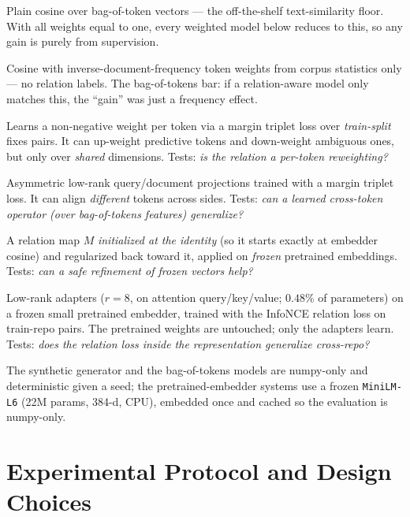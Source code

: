 \documentclass[11pt]{article}
\newcommand{\code}[1]{\texttt{#1}}
\newcommand{\rel}[1]{\textsf{#1}}
\begin{document}
\begin{description}[leftmargin=1.4em,style=nextline]
\item[Vanilla cosine.] Plain cosine over bag-of-token vectors --- the
off-the-shelf text-similarity floor. With all weights equal to one, every weighted
model below reduces to this, so any gain is purely from supervision.
\item[Unsupervised IDF cosine.] Cosine with inverse-document-frequency token
weights from corpus statistics only --- no relation labels. The bag-of-tokens bar:
if a relation-aware model only matches this, the ``gain'' was just a frequency
effect.
\item[Diagonal relation metric.] Learns a non-negative weight per token via a
margin triplet loss over \emph{train-split} \rel{fixes} pairs. It can up-weight
predictive tokens and down-weight ambiguous ones, but only over \emph{shared}
dimensions. Tests: \emph{is the relation a per-token reweighting?}
\item[Two-tower projection.] Asymmetric low-rank query/document projections trained
with a margin triplet loss. It can align \emph{different} tokens across sides.
Tests: \emph{can a learned cross-token operator (over bag-of-tokens features)
generalize?}
\item[Identity-init operator.] A relation map $M$ \emph{initialized at the
identity} (so it starts exactly at embedder cosine) and regularized back toward it,
applied on \emph{frozen} pretrained embeddings. Tests: \emph{can a safe refinement
of frozen vectors help?}
\item[LoRA-fine-tuned encoder.] Low-rank adapters ($r{=}8$, on attention
query/key/value; $0.48\%$ of parameters) on a frozen small pretrained embedder,
trained with the InfoNCE relation loss on train-repo pairs. The pretrained weights
are untouched; only the adapters learn. Tests: \emph{does the relation loss inside
the representation generalize cross-repo?}
\end{description}

The synthetic generator and the bag-of-tokens models are numpy-only and
deterministic given a seed; the pretrained-embedder systems use a frozen
\code{MiniLM-L6} (22M params, 384-d, CPU), embedded once and cached so the
evaluation is numpy-only.

\section{Experimental Protocol and Design Choices}
\label{sec:protocol}
\end{document}
